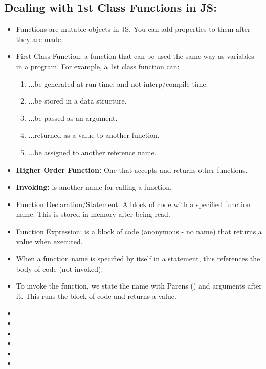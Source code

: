 \documentclass[8pt,a4paper]{extarticle}
\begin{document}
\subsection*{Dealing with 1st Class Functions in JS:}
\begin{itemize}
\item Functions are mutable objects in JS. You can add properties to them after they are made.
\item First Class Function: a function that can be used the same way as variables in a program. For example, a 1st class function can:
\begin{enumerate}
\item ...be generated at run time, and not interp/compile time.
\item ...be stored in a data structure.
\item ...be passed as an argument.
\item ...returned as a value to another function.
\item ...be assigned to another reference name.

\end{enumerate}
\item \textbf{Higher Order Function:} One that accepts and returns other functions.
\item \textbf{Invoking:} is another name for calling a function.
\item Function Declaration/Statement: A block of code with a specified function name. This is stored in memory after being read.
\item Function Expression: is a block of code (anonymous - no name) that returns a value when executed.
\item When a function name is specified by itself in a statement, this references the body of code (not invoked).
\item To invoke the function, we state the name with Parens () and arguments after it. This runs the block of code and returns a value.
\item
\item
\item
\item
\item
\item

\end{itemize}
\end{document}
